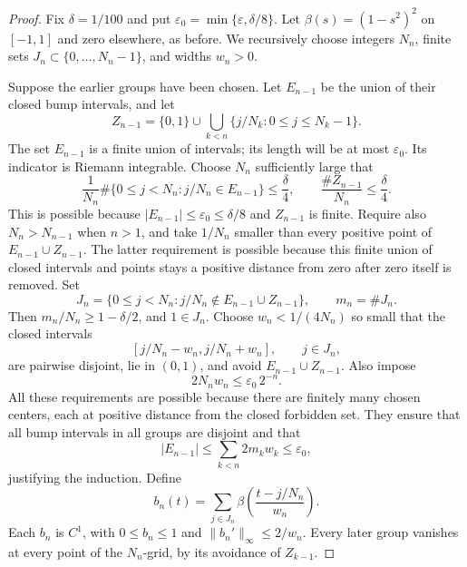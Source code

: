 \documentclass[11pt,a4paper]{article}
\theoremstyle{remark}
\begin{document}
\begin{proof}
Fix $\delta=1/100$ and put
$\varepsilon_0=\min\{\varepsilon,\delta/8\}$.
Let $\beta(s)=(1-s^2)^2$ on $[-1,1]$ and zero elsewhere, as before.
We recursively choose integers $N_n$, finite sets
$J_n\subset\{0,\ldots,N_n-1\}$, and widths $w_n>0$.

Suppose the earlier groups have been chosen. Let $E_{n-1}$ be the
union of their closed bump intervals, and let
\[
 Z_{n-1}=\{0,1\}\cup
  \bigcup_{k<n}\{j/N_k:0\le j\le N_k-1\}.
\]
The set $E_{n-1}$ is a finite union of intervals; its length will be at
most $\varepsilon_0$. Its indicator is Riemann integrable. Choose $N_n$
sufficiently large that
\[
 \frac1{N_n}\#\{0\le j<N_n:j/N_n\in E_{n-1}\}\le\frac\delta4,
 \qquad
 \frac{\# Z_{n-1}}{N_n}\le\frac\delta4.
\]
This is possible because $|E_{n-1}|\le\varepsilon_0\le\delta/8$ and
$Z_{n-1}$ is finite. Require also $N_n>N_{n-1}$ when $n>1$, and take
$1/N_n$ smaller than every positive point of
$E_{n-1}\cup Z_{n-1}$. The latter requirement is possible because this
finite union of closed intervals and points stays a positive distance
from zero after zero itself is removed. Set
\[
 J_n=\{0\le j<N_n:j/N_n\notin E_{n-1}\cup Z_{n-1}\},
 \qquad m_n=\#J_n.
\]
Then $m_n/N_n\ge1-\delta/2$, and $1\in J_n$. Choose
$w_n<1/(4N_n)$ so small that the closed
intervals
\[
 [j/N_n-w_n,j/N_n+w_n],\qquad j\in J_n,
\]
are pairwise disjoint, lie in $(0,1)$, and avoid
$E_{n-1}\cup Z_{n-1}$. Also impose
\[
 2N_nw_n\le\varepsilon_0\,2^{-n}.
\]
All these requirements are possible because there are finitely many
chosen centers, each at positive distance from the closed forbidden set.
They ensure that all bump intervals in all groups are disjoint and that
\[
 |E_{n-1}|\le\sum_{k<n}2m_kw_k\le\varepsilon_0,
\]
justifying the induction. Define
\[
 b_n(t)=\sum_{j\in J_n}\beta\!\left(\frac{t-j/N_n}{w_n}\right).
\]
Each $b_n$ is $C^1$, with $0\le b_n\le1$ and
$\|b_n'\|_\infty\le2/w_n$. Every later group vanishes at every point
of the $N_n$-grid, by its avoidance of $Z_{k-1}$.


\end{proof}
\end{document}

